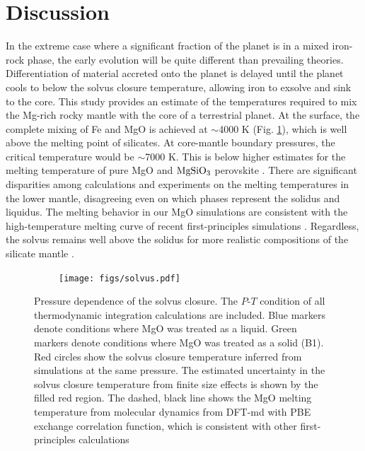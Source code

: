 \section{Discussion} \label{sec:discussion}

In the extreme case where a significant fraction of the planet is in a mixed iron-rock
phase, the early evolution will be quite different than prevailing theories.
Differentiation of material accreted onto the planet is delayed until the planet cools to
below the solvus closure temperature, allowing iron to exsolve and sink to the core.
This study provides an estimate of the temperatures required to mix the Mg-rich rocky
mantle with the core of a terrestrial planet. At the surface, the complete mixing of Fe
and MgO is achieved at $\sim$4000 K (Fig. \ref{fig:summary}), which is well above the
melting point of silicates. At core-mantle boundary pressures, the critical temperature
would be $\sim$7000 K.  This is below higher estimates for the melting temperature of
pure MgO \citep{Alfe2005,Belonoshko2010,Boates2013} and $\rm{MgSiO_3}$ perovskite
\citep{Zerr1993}. There are significant disparities among calculations and experiments
on the melting \citep{Belonoshko1994,Belonoshko1997,Alfe2005,Zerr1998}
temperatures in the lower mantle, disagreeing even on which phases represent the solidus
and liquidus. The melting behavior in our MgO simulations are consistent with the
high-temperature melting curve of recent first-principles simulations
\citep{Alfe2005,Belonoshko2010,Boates2013}.  Regardless, the solvus remains well above
the solidus for more realistic compositions of the silicate mantle
\citep{deKoker2013,Zerr1998,Holland1997}.

\begin{figure}[h!]  
  \centering
    \texttt{[image: figs/solvus.pdf]}
\caption{Pressure dependence of the solvus closure. The $P$-$T$ condition of all
  thermodynamic integration calculations are included. Blue markers denote conditions
  where MgO was treated as a liquid. Green markers denote conditions where MgO was
  treated as a solid (B1).  Red circles show the solvus closure temperature inferred from
  simulations at the same pressure. The estimated uncertainty in the solvus closure
  temperature from finite size effects is shown by the filled red region.  The dashed,
  black line shows the MgO melting temperature from molecular dynamics from DFT-md with
  PBE exchange correlation function\citep{Boates2013}, which is consistent with other
  first-principles calculations \citep{Alfe2005,Belonoshko2010}}
\label{fig:summary}
\end{figure}


